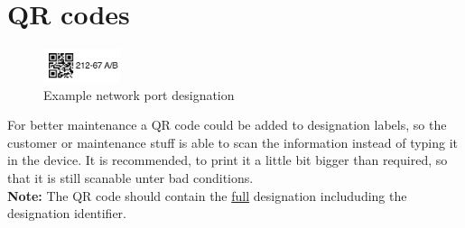 %
%
%
%
%
%
%

\section{QR codes}

\begin{figure}
	\includegraphics[width=0.2\textwidth]{qr.png}

	\caption{Example network port designation}
\end{figure}

For better maintenance a QR code could be added to designation labels, so the
customer or maintenance stuff is able to scan the information instead of typing
it in the device. It is recommended, to print it a little bit bigger than
required, so that it is still scanable unter bad conditions. \\

\textbf{Note:} The QR code should contain the \underline{full} designation
includuding the designation identifier.

